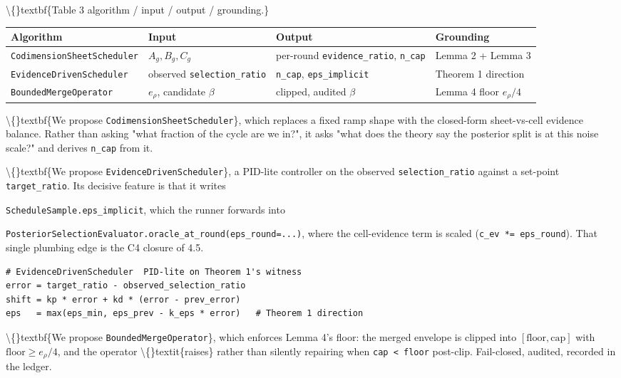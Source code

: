 \documentclass[preprint,3p,times,twocolumn]{elsarticle}
\begin{document}
\textbackslash\{\}textbf\{Table 3  algorithm / input / output / grounding.\}

\begin{table}[ht]
\centering
\small
\begin{tabular}{llll}
\hline
\textbf{Algorithm} & \textbf{Input} & \textbf{Output} & \textbf{Grounding} \\
\hline
\texttt{CodimensionSheetScheduler} & $A_g, B_g, C_g$ & per-round \texttt{evidence\_ratio}, \texttt{n\_cap} & Lemma 2 + Lemma 3 \\
\texttt{EvidenceDrivenScheduler} & observed \texttt{selection\_ratio} & \texttt{n\_cap}, \texttt{eps\_implicit} & Theorem 1 direction \\
\texttt{BoundedMergeOperator} & $e_\rho$, candidate $\beta$ & clipped, audited $\beta$ & Lemma 4 floor $e_\rho/4$ \\
\hline
\end{tabular}
\end{table}

\textbackslash\{\}textbf\{We propose \texttt{CodimensionSheetScheduler}\}, which replaces a fixed ramp shape with the closed-form sheet-vs-cell evidence balance. Rather than asking "what fraction of the cycle are we in?", it asks "what does the theory say the posterior split is at this noise scale?" and derives \texttt{n\_cap} from it.

\textbackslash\{\}textbf\{We propose \texttt{EvidenceDrivenScheduler}\}, a PID-lite controller on the observed \texttt{selection\_ratio} against a set-point \texttt{target\_ratio}. Its decisive feature is that it writes

\texttt{ScheduleSample.eps\_implicit}, which the runner forwards into

\texttt{PosteriorSelectionEvaluator.oracle\_at\_round(eps\_round=...)}, where the cell-evidence term is scaled (\texttt{c\_ev *= eps\_round}). That single plumbing edge is the C4 closure of 4.5.

\begin{verbatim}
# EvidenceDrivenScheduler  PID-lite on Theorem 1's witness
error = target_ratio - observed_selection_ratio
shift = kp * error + kd * (error - prev_error)
eps   = max(eps_min, eps_prev - k_eps * error)   # Theorem 1 direction
\end{verbatim}
\textbackslash\{\}textbf\{We propose \texttt{BoundedMergeOperator}\}, which enforces Lemma 4's floor: the merged envelope is clipped into $[\text{floor}, \text{cap}]$ with $\text{floor} \ge e_\rho/4$, and the operator \textbackslash\{\}textit\{raises\} rather than silently repairing when \texttt{cap < floor} post-clip. Fail-closed, audited, recorded in the ledger.
\end{document}
